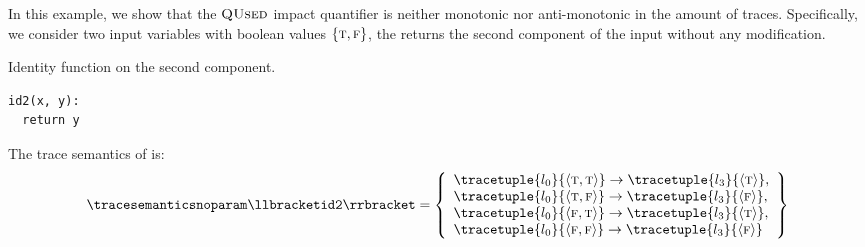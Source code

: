 \begin{example}
In this example, we show that the $\textup{\textsc{QUsed}}$ impact quantifier is neither monotonic nor anti-monotonic in the amount of traces.
Specifically, we consider two input variables with boolean values $\{\textsc{t}, \textsc{f}\}$, the  returns the second component of the input without any modification.
\begin{marginlisting}
  \caption{Identity function on the second component.}
  \vspace{25pt}
\begin{lstlisting}[style=mystyle,language=customPython]
id2(x, y):
  return y
 \end{lstlisting}
\end{marginlisting}
The trace semantics of  is:
\begin{align*}
  \tracesemanticsnoparam\semanticsof{\texttt{id2}}
  =
  \left\{
    \begin{array}{l}
      \tracetuple{\locinit}{\langle \true, \true\rangle}\rightarrow\tracetuple{\loc{3}}{\langle \true\rangle}, \\
      \tracetuple{\locinit}{\langle \true, \false\rangle}\rightarrow\tracetuple{\loc{3}}{\langle \false\rangle}, \\
      \tracetuple{\locinit}{\langle \false, \true\rangle}\rightarrow\tracetuple{\loc{3}}{\langle \true\rangle}, \\
      \tracetuple{\locinit}{\langle \false, \false\rangle}\rightarrow\tracetuple{\loc{3}}{\langle \false\rangle}
    \end{array}
    \right\}
\end{align*}
\begin{marginfigure}
\end{marginfigure}
\end{example}
